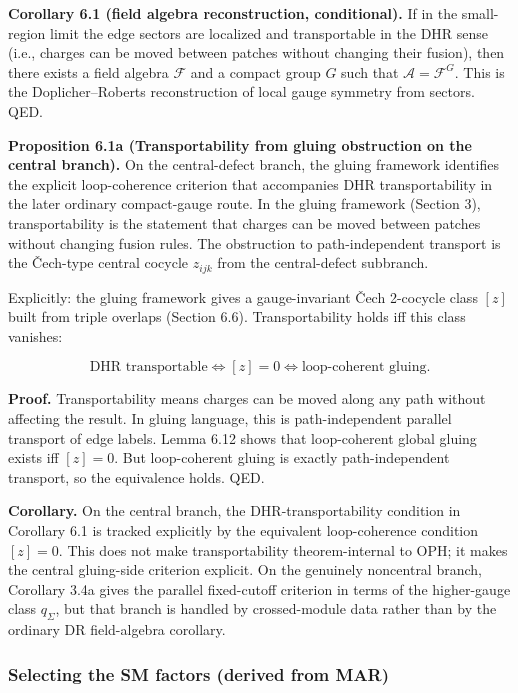 \textbf{Corollary 6.1 (field algebra reconstruction, conditional).} If in the small-region limit the edge sectors are localized and transportable in the DHR sense (i.e., charges can be moved between patches without changing their fusion), then there exists a field algebra \(\mathcal F\) and a compact group \(G\) such that \(\mathcal A = \mathcal F^G\). This is the Doplicher--Roberts reconstruction of local gauge symmetry from sectors. QED.

\textbf{Proposition 6.1a (Transportability from gluing obstruction on the central branch).} On the central-defect branch, the gluing framework identifies the explicit loop-coherence criterion that accompanies DHR transportability in the later ordinary compact-gauge route. In the gluing framework (Section 3), transportability is the statement that charges can be moved between patches without changing fusion rules. The obstruction to path-independent transport is the \v{C}ech-type central cocycle \(z_{ijk}\) from the central-defect subbranch.

Explicitly: the gluing framework gives a gauge-invariant \v{C}ech 2-cocycle class \([z]\) built from triple overlaps (Section 6.6). Transportability holds iff this class vanishes:

\[
\text{DHR transportable} \iff [z] = 0 \iff \text{loop-coherent gluing}.
\]

\textbf{Proof.} Transportability means charges can be moved along any path without affecting the result. In gluing language, this is path-independent parallel transport of edge labels. Lemma 6.12 shows that loop-coherent global gluing exists iff \([z] = 0\). But loop-coherent gluing is exactly path-independent transport, so the equivalence holds. QED.

\textbf{Corollary.} On the central branch, the DHR-transportability condition in Corollary 6.1 is tracked explicitly by the equivalent loop-coherence condition \([z]=0\). This does not make transportability theorem-internal to OPH; it makes the central gluing-side criterion explicit. On the genuinely noncentral branch, Corollary 3.4a gives the parallel fixed-cutoff criterion in terms of the higher-gauge class \(q_\Sigma\), but that branch is handled by crossed-module data rather than by the ordinary DR field-algebra corollary.

\subsubsection{Selecting the SM factors (derived from MAR)}\label{62-selecting-the-sm-factors-derived-from-mar}

